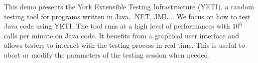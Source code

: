This demo presents the York Extensible Testing Infrastructure (YETI), a random testing tool for programs written in Java, .NET, JML... We focus on how to test Java code using YETI. The tool runs at a high level of performances with $10^6$ calls per minute on Java code. It benefits from a graphical user interface and allows testers to interact with the testing process in real-time. This is useful to abort or modify the parameters of the testing session when needed. 
